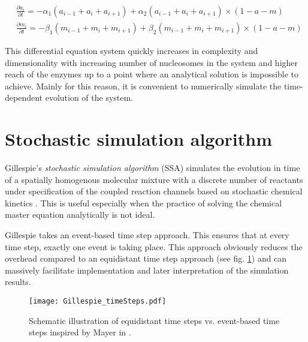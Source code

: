         \begin{subequations}
            \begin{align}
                &\frac{\partial a_i}{\partial t} = - \alpha_1 (a_{i-1} + a_i + a_{i+1}) + \alpha_2 (a_{i-1} + a_i + a_{i+1}) \times (1-a-m)\\
                &\frac{\partial m_i}{\partial t} = - \beta_1 (m_{i-1} + m_i + m_{i+1}) + \beta_2 (m_{i-1} + m_i + m_{i+1}) \times (1-a-m)
            \end{align}
            \label{eqn:neighbourDependent}
        \end{subequations}

        This differential equation system quickly increases in complexity and dimensionality with increasing number of nucleosomes in the system and higher reach of the enzymes up to a point where an analytical solution is impossible to achieve. Mainly for this reason, it is convenient to numerically simulate the time-dependent evolution of the system.
    \section{Stochastic simulation algorithm}
    \label{subsec:Gillespie}
        Gillespie's \textit{stochastic simulation algorithm} (SSA) simulates the evolution in time of a spatially homogenous molecular mixture with a discrete number of reactants under specification of the coupled reaction channels based on stochastic chemical kinetics \cite{gillespie1976general, gillespie1992rigorous}. This is useful especially when the practice of solving the chemical master equation analytically is not ideal.

        Gillespie takes an event-based time step approach. This ensures that at every time step, exactly one event is taking place. This approach obviously reduces the overhead compared to an equidistant time step approach (see fig. \ref{img:Gillespie_timeSteps}) and can massively facilitate implementation and later interpretation of the simulation results.

        \begin{figure}[htpb!]
            \centering
            \texttt{[image: Gillespie\_timeSteps.pdf]}
            \caption{Schematic illustration of equidistant time steps vs. event-based time steps inspired by Mayer in \cite{mayer2020langevin}.}
            \label{img:Gillespie_timeSteps}
        \end{figure}

